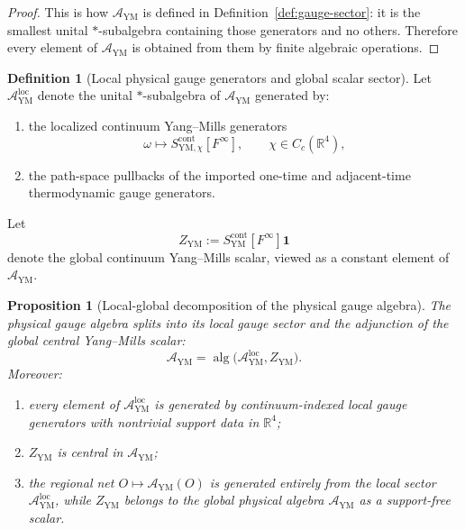 \documentclass[11pt]{article}
\newtheorem{proposition}[theorem]{Proposition}
\theoremstyle{definition}
\newtheorem{definition}[theorem]{Definition}
\theoremstyle{remark}
\newcommand{\R}{\mathbb R}
\newcommand{\mcA}{\mathcal A}
\begin{document}
\begin{proof}
This is how \(\mcA_{\mathrm{YM}}\) is defined in
Definition~\ref{def:gauge-sector}: it is the smallest unital \( * \)-subalgebra
containing those generators and no others.  Therefore every element of
\(\mcA_{\mathrm{YM}}\) is obtained from them by finite algebraic operations.
\end{proof}

\begin{definition}[Local physical gauge generators and global scalar sector]
\label{def:local-global-gauge}
Let \(\mcA_{\mathrm{YM}}^{\mathrm{loc}}\) denote the unital \( * \)-subalgebra
of \(\mcA_{\mathrm{YM}}\) generated by:
\begin{enumerate}[label=\textnormal{(\roman*)},leftmargin=1.5em]
\item the localized continuum Yang--Mills generators
\[
\omega\longmapsto S_{\mathrm{YM},\chi}^{\mathrm{cont}}[F^\infty],
\qquad \chi\in C_c(\R^4),
\]
\item the path-space pullbacks of the imported one-time and adjacent-time
thermodynamic gauge generators.
\end{enumerate}
Let
\[
Z_{\mathrm{YM}}
:=
S_{\mathrm{YM}}^{\mathrm{cont}}[F^\infty]\mathbf 1
\]
denote the global continuum Yang--Mills scalar, viewed as a constant element of
\(\mcA_{\mathrm{YM}}\).
\end{definition}

\begin{proposition}[Local-global decomposition of the physical gauge algebra]
\label{prop:local-global-decomposition}
The physical gauge algebra splits into its local gauge sector and the adjunction
of the global central Yang--Mills scalar:
\[
\mcA_{\mathrm{YM}}
=
\operatorname{alg}\bigl(\mcA_{\mathrm{YM}}^{\mathrm{loc}},Z_{\mathrm{YM}}\bigr).
\]
Moreover:
\begin{enumerate}[label=\textnormal{(\roman*)},leftmargin=1.5em]
\item every element of \(\mcA_{\mathrm{YM}}^{\mathrm{loc}}\) is generated by
continuum-indexed local gauge generators with nontrivial support data in
\(\R^4\);
\item \(Z_{\mathrm{YM}}\) is central in \(\mcA_{\mathrm{YM}}\);
\item the regional net \(O\mapsto\mcA_{\mathrm{YM}}(O)\) is generated entirely
from the local sector \(\mcA_{\mathrm{YM}}^{\mathrm{loc}}\), while
\(Z_{\mathrm{YM}}\) belongs to the global physical algebra \(\mcA_{\mathrm{YM}}\)
as a support-free scalar.
\end{enumerate}
\end{proposition}
\end{document}
